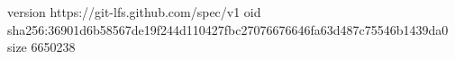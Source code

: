 version https://git-lfs.github.com/spec/v1
oid sha256:36901d6b58567de19f244d110427fbc27076676646fa63d487c75546b1439da0
size 6650238
